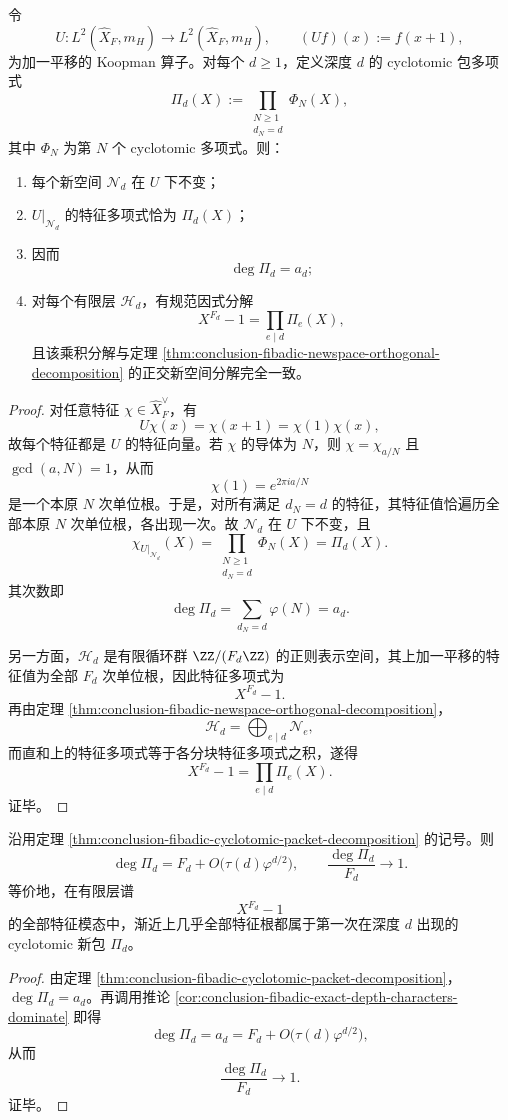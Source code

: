 \begin{theorem}\label{thm:conclusion-fibadic-cyclotomic-packet-decomposition}
令
\[
U:L^2(\widehat X_F,m_H)\to L^2(\widehat X_F,m_H),
\qquad
(Uf)(x):=f(x+1),
\]
为加一平移的 Koopman 算子。对每个 \(d\ge 1\)，定义深度 \(d\) 的 cyclotomic 包多项式
\[
\Pi_d(X):=\prod_{\substack{N\ge 1\\ d_N=d}}\Phi_N(X),
\]
其中 \(\Phi_N\) 为第 \(N\) 个 cyclotomic 多项式。则：
\begin{enumerate}
  \item 每个新空间 \(\mathcal N_d\) 在 \(U\) 下不变；
  \item \(U|_{\mathcal N_d}\) 的特征多项式恰为 \(\Pi_d(X)\)；
  \item 因而
  \[
  \deg \Pi_d=a_d;
  \]
  \item 对每个有限层 \(\mathcal H_d\)，有规范因式分解
  \[
  X^{F_d}-1=\prod_{e\mid d}\Pi_e(X),
  \]
  且该乘积分解与定理 \ref{thm:conclusion-fibadic-newspace-orthogonal-decomposition} 的正交新空间分解完全一致。
\end{enumerate}
\end{theorem}
\begin{proof}
对任意特征 \(\chi\in \widehat X_F^\vee\)，有
\[
U\chi(x)=\chi(x+1)=\chi(1)\chi(x),
\]
故每个特征都是 \(U\) 的特征向量。若 \(\chi\) 的导体为 \(N\)，则 \(\chi=\chi_{a/N}\) 且 \(\gcd(a,N)=1\)，从而
\[
\chi(1)=e^{2\pi i a/N}
\]
是一个本原 \(N\) 次单位根。于是，对所有满足 \(d_N=d\) 的特征，其特征值恰遍历全部本原 \(N\) 次单位根，各出现一次。故 \(\mathcal N_d\) 在 \(U\) 下不变，且
\[
\chi_{U|_{\mathcal N_d}}(X)
=
\prod_{\substack{N\ge 1\\ d_N=d}}\Phi_N(X)
=
\Pi_d(X).
\]
其次数即
\[
\deg \Pi_d
=
\sum_{d_N=d}\varphi(N)
=
a_d.
\]

另一方面，\(\mathcal H_d\) 是有限循环群 \(\ZZ/(F_d\ZZ)\) 的正则表示空间，其上加一平移的特征值为全部 \(F_d\) 次单位根，因此特征多项式为
\[
X^{F_d}-1.
\]
再由定理 \ref{thm:conclusion-fibadic-newspace-orthogonal-decomposition}，
\[
\mathcal H_d=\bigoplus_{e\mid d}\mathcal N_e,
\]
而直和上的特征多项式等于各分块特征多项式之积，遂得
\[
X^{F_d}-1=\prod_{e\mid d}\Pi_e(X).
\]
证毕。
\end{proof}

\begin{corollary}\label{cor:conclusion-fibadic-new-harmonics-dominate}
沿用定理 \ref{thm:conclusion-fibadic-cyclotomic-packet-decomposition} 的记号。则
\[
\deg \Pi_d
=
F_d+O\!\bigl(\tau(d)\varphi^{d/2}\bigr),
\qquad
\frac{\deg \Pi_d}{F_d}\to 1.
\]
等价地，在有限层谱
\[
X^{F_d}-1
\]
的全部特征模态中，渐近上几乎全部特征根都属于第一次在深度 \(d\) 出现的 cyclotomic 新包 \(\Pi_d\)。
\end{corollary}
\begin{proof}
由定理 \ref{thm:conclusion-fibadic-cyclotomic-packet-decomposition}，\(\deg \Pi_d=a_d\)。再调用推论 \ref{cor:conclusion-fibadic-exact-depth-characters-dominate} 即得
\[
\deg \Pi_d
=
a_d
=
F_d+O\!\bigl(\tau(d)\varphi^{d/2}\bigr),
\]
从而
\[
\frac{\deg \Pi_d}{F_d}\to 1.
\]
证毕。
\end{proof}

